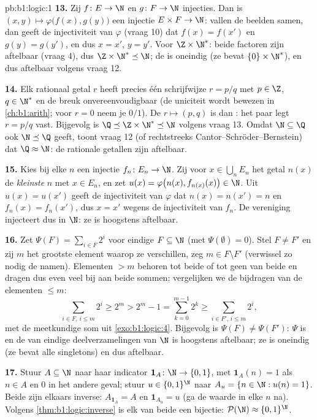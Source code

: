 \begin{solution}{pb:b1:logic:1}
\textbf{13.} Zij $f \colon E \to \N$ en $g \colon F \to \N$ injecties.
Dan is $(x, y) \mapsto \varphi\bigl(f(x), g(y)\bigr)$ een injectie $E
\times F \to \N$: vallen de beelden samen, dan geeft de injectiviteit van
$\varphi$ (vraag 10) dat $f(x) = f(x')$ en $g(y) = g(y')$, en dus $x =
x'$, $y = y'$. Voor $\Z \times \N^*$: beide factoren zijn aftelbaar
(vraag 4), dus $\Z \times \N^* \preceq \N$; de  is oneindig
(ze bevat $\{0\} \times \N^*$), en dus aftelbaar volgens vraag 12.

\textbf{14.} Elk rationaal getal $r$ heeft precies één schrijfwijze $r =
p/q$ met $p \in \Z$, $q \in \N^*$ en de breuk onvereenvoudigbaar (de
uniciteit wordt bewezen in \cref{ch:b1:arith}; voor $r = 0$ neem je
$0/1$). De  $r \mapsto (p, q)$ is dan : het paar legt
$r = p/q$ vast. Bijgevolg is $\Q \preceq \Z \times \N^* \preceq \N$
volgens vraag 13. Omdat $\N \subseteq \Q$ ook $\N \preceq \Q$ geeft,
toont vraag 12 (of rechtstreeks Cantor--Schröder--Bernstein) dat $\Q
\approx \N$: de rationale getallen zijn aftelbaar.

\textbf{15.} Kies bij elke $n$ een injectie $f_n \colon E_n \to \N$. Zij
voor $x \in \bigcup_n E_n$ het getal $n(x)$ de \emph{kleinste} $n$ met $x
\in E_n$, en zet $u(x) = \varphi\bigl(n(x), f_{n(x)}(x)\bigr) \in \N$.
Uit $u(x) = u(x')$ geeft de injectiviteit van $\varphi$ dat $n(x) = n(x')
= n$ en $f_n(x) = f_n(x')$, dus $x = x'$ wegens de injectiviteit van
$f_n$. De vereniging injecteert dus in $\N$: ze is hoogstens aftelbaar.

\textbf{16.} Zet $\Psi(F) = \sum_{i \in F} 2^i$ voor eindige $F \subseteq
\N$ (met $\Psi(\emptyset) = 0$). Stel $F \neq F'$ en zij $m$ het grootste
element waarop ze verschillen, zeg $m \in F \setminus F'$ (verwissel zo
nodig de namen). Elementen $> m$ behoren tot beide of tot geen van beide
en dragen dus even veel bij aan beide sommen; vergelijken we de bijdragen
van de elementen $\leq m$:
\[
\sum_{i \in F,\, i \leq m} 2^i \geq 2^m
> 2^m - 1 = \sum_{k=0}^{m-1} 2^k
\geq \sum_{i \in F',\, i \leq m} 2^i ,
\]
met de meetkundige som uit \cref{exo:b1:logic:4}. Bijgevolg is $\Psi(F)
\neq \Psi(F')$: $\Psi$ is  en de  van eindige
deelverzamelingen van $\N$ is hoogstens aftelbaar; ze is oneindig (ze
bevat alle singletons) en dus aftelbaar.

\textbf{17.} Stuur $A \subseteq \N$ naar haar indicator $\mathbf 1_A
\colon \N \to \{0,1\}$, met $\mathbf 1_A(n) = 1$ als $n \in A$ en $0$ in
het andere geval; stuur $u \in \{0,1\}^{\N}$ naar $A_u = \{n \in \N :
u(n) = 1\}$. Beide  zijn elkaars inverse: $A_{\mathbf 1_A} =
A$ en $\mathbf 1_{A_u} = u$ (ga de waarde in elke $n$ na). Volgens
\cref{thm:b1:logic:inverse} is elk van beide een bijectie:
$\mathcal{P}(\N) \approx \{0,1\}^{\N}$.


\end{solution}
